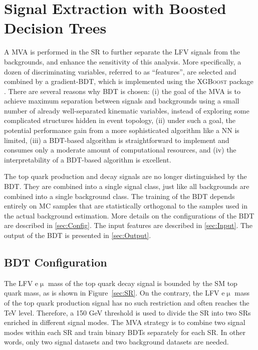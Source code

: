 \chapter{Signal Extraction with Boosted Decision Trees}
\label{chap:BDT}

A \ac{MVA} is performed in the \ac{SR} to further separate the LFV signals from the backgrounds, and enhance the sensitivity of this analysis. More specifically, a dozen of discriminating variables, referred to as ``features'', are selected and combined by a gradient-\ac{BDT}, which is implemented using the \textsc{XGBoost} package \cite{Chen:2016:XST:2939672.2939785}. There are several reasons why \ac{BDT} is chosen: (i) the goal of the \ac{MVA} is to achieve maximum separation between signals and backgrounds using a small number of already well-separated kinematic variables, instead of exploring some complicated structures hidden in event topology, (ii) under such a goal, the potential performance gain from a more sophisticated algorithm like a \ac{NN} is limited, (iii) a \ac{BDT}-based algorithm is straightforward to implement and consumes only a moderate amount of computational resources, and (iv) the interpretability of a \ac{BDT}-based algorithm is excellent. 

The top quark production and decay signals are no longer distinguished by the \ac{BDT}. They are combined into a single signal class, just like all backgrounds are combined into a single background class. The training of the \ac{BDT} depends entirely on \ac{MC} samples that are statistically orthogonal to the samples used in the actual background estimation. More details on the configurations of the \ac{BDT} are described in \autoref{sec:Config}. The input features are described in \autoref{sec:Input}. The output of the \ac{BDT} is presented in \autoref{sec:Output}.

\section{BDT Configuration}
\label{sec:Config}

The LFV e$\upmu$ mass of the top quark decay signal is bounded by the \ac{SM} top quark mass, as is shown in Figure~\ref{sec:SR}. On the contrary, the LFV e$\upmu$ mass of the top quark production signal has no such restriction and often reaches the TeV level. Therefore, a 150 GeV threshold is used to divide the \ac{SR} into two \acp{SR} enriched in different signal modes. The \ac{MVA} strategy is to combine two signal modes within each \ac{SR} and train binary \acp{BDT} separately for each \ac{SR}. In other words, only two signal datasets and two background datasets are needed.
  
